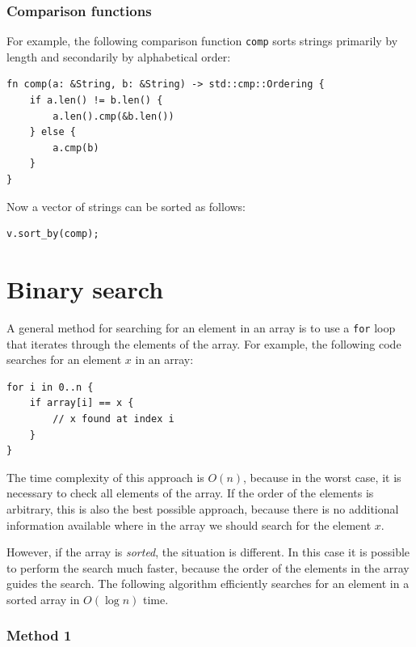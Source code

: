 \subsubsection{Comparison functions}


For example, the following comparison function \texttt{comp}
sorts strings primarily by length and secondarily
by alphabetical order:

\begin{lstlisting}
fn comp(a: &String, b: &String) -> std::cmp::Ordering {
    if a.len() != b.len() {
        a.len().cmp(&b.len())
    } else {
        a.cmp(b)
    }
}
\end{lstlisting}
Now a vector of strings can be sorted as follows:
\begin{lstlisting}
v.sort_by(comp);
\end{lstlisting}

\section{Binary search}


A general method for searching for an element
in an array is to use a \texttt{for} loop
that iterates through the elements of the array.
For example, the following code searches for
an element $x$ in an array:

\begin{lstlisting}
for i in 0..n {
    if array[i] == x {
        // x found at index i
    }
}
\end{lstlisting}

The time complexity of this approach is $O(n)$,
because in the worst case, it is necessary to check
all elements of the array.
If the order of the elements is arbitrary,
this is also the best possible approach, because
there is no additional information available where
in the array we should search for the element $x$.

However, if the array is \emph{sorted},
the situation is different.
In this case it is possible to perform the
search much faster, because the order of the
elements in the array guides the search.
The following  algorithm
efficiently searches for an element in a sorted array
in $O(\log n)$ time.

\subsubsection{Method 1}

